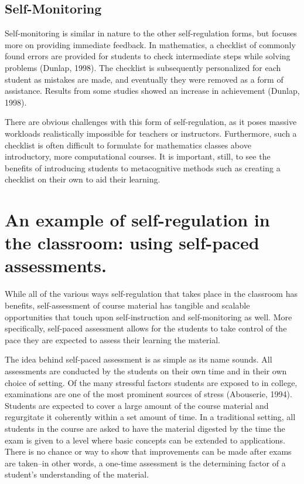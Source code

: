 \subsection{Self-Monitoring}
Self-monitoring is similar in nature to the other self-regulation forms, but focuses more on providing immediate feedback. In mathematics, a checklist of commonly found errors are provided for students to check intermediate steps while solving problems (Dunlap, 1998). The checklist is subsequently personalized for each student as mistakes are made, and eventually they were removed as a form of assistance. Results from some studies showed an increase in achievement (Dunlap, 1998).

There are obvious challenges with this form of self-regulation, as it  poses massive workloads realistically impossible for teachers or instructors. Furthermore, such a checklist is often difficult to formulate for mathematics classes above introductory, more computational courses. It is important, still, to see the benefits of introducing students to metacognitive methods such as creating a checklist on their own to aid their learning.

\section{An example of self-regulation in the classroom: using self-paced assessments.}
While all of the various ways self-regulation that takes place in the classroom has benefits, self-assessment of course material has tangible and scalable opportunities that touch upon self-instruction and self-monitoring as well. More specifically, self-paced assessment allows for the students to take control of the pace they are expected to assess their learning the material.

The idea behind self-paced assessment is as simple as its name sounds. All assessments are conducted by the students on their own time and in their own choice of setting. Of the many stressful factors students are exposed to in college, examinations are one of the most prominent sources of stress (Abouserie, 1994). Students are expected to cover a large amount of the course material and regurgitate it coherently within a set amount of time. In a traditional setting, all students in the course are asked to have the material digested by the time the exam is given to a level where basic concepts can be extended to applications. There is no chance or way to show that improvements can be made after exams are taken--in other words, a one-time assessment is the determining factor of a student's understanding of the material.

